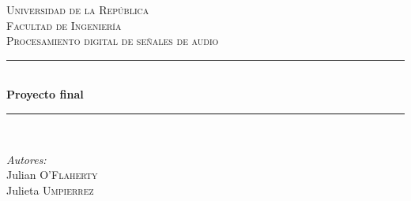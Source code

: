 \begin{titlepage}

\newcommand{\HRule}{\rule{\linewidth}{0.5mm}} %

\center %
 

\textsc{\LARGE Universidad de la República}\\[1.5cm] %
\textsc{\Large Facultad de Ingeniería}\\[0.5cm] %
\textsc{\large Procesamiento digital de señales de audio}\\[0.5cm] %


\HRule \\[0.4cm]
{ \huge \bfseries Proyecto final}\\[0.4cm] %
\HRule \\[1.5cm]
 

\begin{minipage}{0.4\textwidth}
\begin{flushleft} \large
\emph{Autores:}\\
Julian \textsc{O'Flaherty} \\
Julieta \textsc{Umpierrez}
\end{flushleft}
\end{minipage}
~
\begin{minipage}{0.4\textwidth}
\begin{flushright} \large
\end{flushright}
\end{minipage}\\[2cm]


\end{titlepage}

